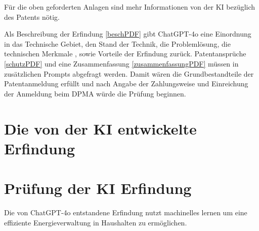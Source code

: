 Für die oben geforderten Anlagen sind mehr Informationen von der KI
bezüglich des Patents nötig.

Als Beschreibung der Erfindung \ref{beschPDF} gibt ChatGPT-4o eine Einordnung 
in das Technische Gebiet, den Stand der Technik, die Problemlösung,
die technischen Merkmale , sowie Vorteile der Erfindung zurück.
Patentansprüche \ref{schutzPDF} 
und eine Zusammenfassung \ref{zusammenfassungPDF} müssen in zusätzlichen Prompts 
abgefragt werden. 
Damit wären die Grundbestandteile der Patentanmeldung erfüllt und nach Angabe der 
Zahlungsweise und
Einreichung der Anmeldung beim DPMA würde die Prüfung beginnen. 

\section{Die von der KI entwickelte Erfindung}


\section{Prüfung der KI Erfindung}
Die von ChatGPT-4o entstandene Erfindung nutzt machinelles lernen um eine effiziente
Energieverwaltung in Haushalten zu ermöglichen. 




